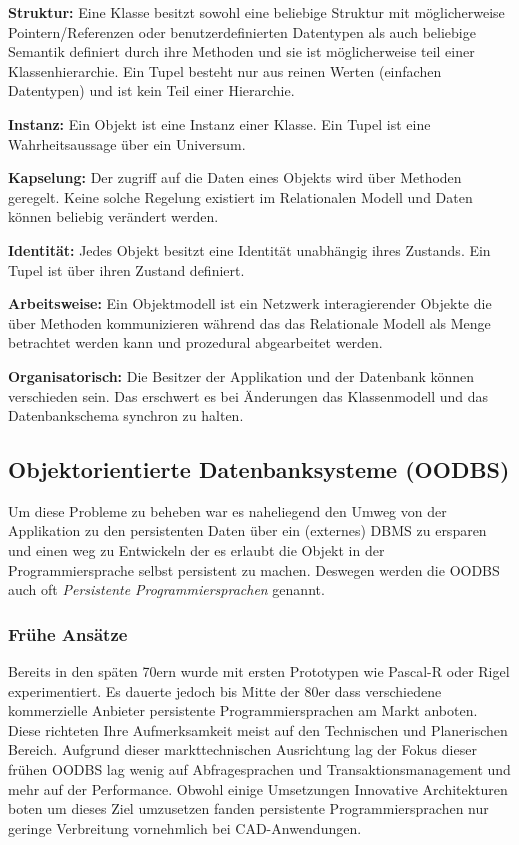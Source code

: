 \begin{description}
	\item \textbf{Struktur:} 
		Eine Klasse besitzt sowohl eine beliebige Struktur mit möglicherweise Pointern/Referenzen oder benutzerdefinierten Datentypen als auch beliebige Semantik definiert durch ihre Methoden und sie ist möglicherweise teil einer Klassenhierarchie. Ein Tupel besteht nur aus reinen Werten (einfachen Datentypen) und ist kein Teil einer Hierarchie.
	
	\item \textbf{Instanz:}
		Ein Objekt ist eine Instanz einer Klasse. Ein Tupel ist eine Wahrheitsaussage über ein Universum.
	
	\item \textbf{Kapselung:} 
		Der zugriff auf die Daten eines Objekts wird über Methoden geregelt. Keine solche Regelung existiert im Relationalen Modell und Daten können beliebig verändert werden.
	
	\item \textbf{Identität:}
		Jedes Objekt besitzt eine Identität unabhängig ihres Zustands. Ein Tupel ist über ihren Zustand definiert. 
	
	\item \textbf{Arbeitsweise:}
		Ein Objektmodell ist ein Netzwerk interagierender Objekte die über Methoden kommunizieren während das das Relationale Modell als Menge betrachtet werden kann und prozedural abgearbeitet werden.
	
	\item \textbf{Organisatorisch:} 
		Die Besitzer der Applikation und der Datenbank können verschieden sein. Das erschwert es bei Änderungen das Klassenmodell und das Datenbankschema synchron zu halten. 
	
\end{description}


\subsection{Objektorientierte Datenbanksysteme (OODBS)}
Um diese Probleme zu beheben war es naheliegend den Umweg von der Applikation zu den persistenten Daten über ein (externes) DBMS zu ersparen und einen weg zu Entwickeln der es erlaubt die Objekt in der Programmiersprache selbst persistent zu machen. Deswegen werden die OODBS auch oft \emph{Persistente Programmiersprachen} genannt.

\subsubsection{Frühe Ansätze}
Bereits in den späten 70ern wurde mit ersten Prototypen wie Pascal-R oder Rigel experimentiert. Es dauerte jedoch bis Mitte der 80er dass verschiedene kommerzielle Anbieter persistente Programmiersprachen am Markt anboten. Diese richteten Ihre Aufmerksamkeit meist auf den Technischen und Planerischen Bereich. Aufgrund dieser markttechnischen Ausrichtung lag der Fokus dieser frühen OODBS lag wenig auf Abfragesprachen und Transaktionsmanagement und mehr auf der Performance. Obwohl einige Umsetzungen Innovative Architekturen boten um dieses Ziel umzusetzen fanden persistente Programmiersprachen nur geringe Verbreitung vornehmlich bei CAD-Anwendungen.

